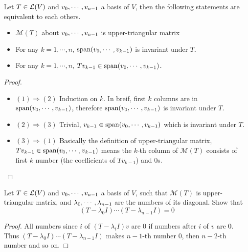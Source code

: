 \documentclass[../main.tex]{subfiles}
\begin{document}
\setcounter{theorem}{38}
\begin{theorem}\label{T5.39}
  Let $T \in \mathcal{L}(V)$ and $v_0 , \cdots , v_{n - 1}$ a basis of $V$, then the following
  statements are equivalent to each others.
  \begin{itemize}
    \item $\mathcal{M}(T)$ about $v_0 , \cdots , v_{n - 1}$ is upper-triangular matrix
    \item For any $k = 1, \cdots, n$, $\operatorname{span}(v_0 , \cdots , v_{k - 1})$ is invariant under $T$.
    \item For any $k = 1, \cdots, n$, $Tv_{k - 1} \in \operatorname{span}(v_0 , \cdots , v_{k - 1})$.
  \end{itemize}
\end{theorem}
\begin{proof}
  ~
  \begin{itemize}
    \item $(1) \Rightarrow (2)$ Induction on $k$. In breif, first $k$ columns
          are in $\operatorname{span}(v_0 , \cdots , v_{k - 1})$, therefore $\operatorname{span}(v_0 , \cdots , v_{k - 1})$
          is invariant under $T$.
    \item $(2) \Rightarrow (3)$ Trivial, $v_{k - 1} \in \operatorname{span}(v_0 , \cdots , v_{k - 1})$ which is invariant under $T$.
    \item $(3) \Rightarrow (1)$ Basically the definition of upper-triangular matrix, $Tv_{k - 1} \in \operatorname{span}(v_0 , \cdots , v_{k - 1})$
          means the $k$-th column of $\mathcal{M}(T)$ consists of first $k$ number (the coefficients of $Tv_{k - 1}$) and $0$s.
  \end{itemize}
\end{proof}

\begin{theorem}
  \label{a}
  Let $T \in \mathcal{L}(V)$ and $v_0 , \cdots , v_{n - 1}$ a basis of $V$, such that $\mathcal{M}(T)$
  is upper-triangular matrix, and $\lambda_0 , \cdots , \lambda_{n - 1}$ are
  the numbers of its diagonal. Show that
  \[
  (T - \lambda_0 I) \cdots (T - \lambda_{n - 1}I) = 0
  \]
\end{theorem}
\begin{proof}
  All numbers since $i$ of $(T - \lambda_i I)v$ are $0$ if numbers after $i$ of $v$ are $0$.
  Thus $(T - \lambda_0 I) \cdots (T - \lambda_{n - 1}I)$ makes $n - 1$-th number $0$,
  then $n - 2$-th number and so on.
\end{proof}
\end{document}
